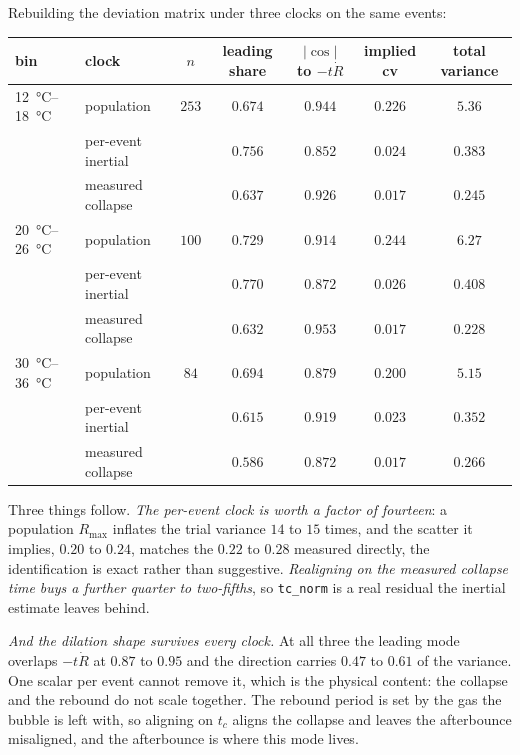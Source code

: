 \documentclass[10pt]{article}
\begin{document}
Rebuilding the deviation matrix under three clocks on the same events:

\begin{center}
\begin{tabular}{llccccc}
\toprule
bin & clock & $n$ & leading share & $\lvert\cos\rvert$ to $-t\dot R$ & implied cv & total variance \\
\midrule
\SIrange{12}{18}{\celsius} & population & $253$ & $0.674$ & $0.944$ & $0.226$ & $5.36$ \\
 & per-event inertial & & $0.756$ & $0.852$ & $0.024$ & $0.383$ \\
 & measured collapse & & $0.637$ & $0.926$ & $0.017$ & $\mathbf{0.245}$ \\
\midrule
\SIrange{20}{26}{\celsius} & population & $100$ & $0.729$ & $0.914$ & $0.244$ & $6.27$ \\
 & per-event inertial & & $0.770$ & $0.872$ & $0.026$ & $0.408$ \\
 & measured collapse & & $0.632$ & $0.953$ & $0.017$ & $\mathbf{0.228}$ \\
\midrule
\SIrange{30}{36}{\celsius} & population & $84$ & $0.694$ & $0.879$ & $0.200$ & $5.15$ \\
 & per-event inertial & & $0.615$ & $0.919$ & $0.023$ & $0.352$ \\
 & measured collapse & & $0.586$ & $0.872$ & $0.017$ & $\mathbf{0.266}$ \\
\bottomrule
\end{tabular}
\end{center}

\noindent Three things follow. \emph{The per-event clock is worth a factor of fourteen}: a
population $R_{\max}$ inflates the trial variance $14$ to $15$ times, and the scatter it implies,
$0.20$ to $0.24$, matches the $0.22$ to $0.28$ measured directly, the identification is exact
rather than suggestive. \emph{Realigning on the measured collapse time buys a further quarter to
two-fifths}, so \texttt{tc\_norm} is a real residual the inertial estimate leaves behind.

\emph{And the dilation shape survives every clock.} At all three the leading mode overlaps
$-t\dot R$ at $0.87$ to $0.95$ and the direction carries $0.47$ to $0.61$ of the variance. One
scalar per event cannot remove it, which is the physical content: the collapse and the rebound do
not scale together. The rebound period is set by the gas the bubble is left with, so aligning on
$t_c$ aligns the collapse and leaves the afterbounce misaligned, and the afterbounce is where
this mode lives.
\end{document}
